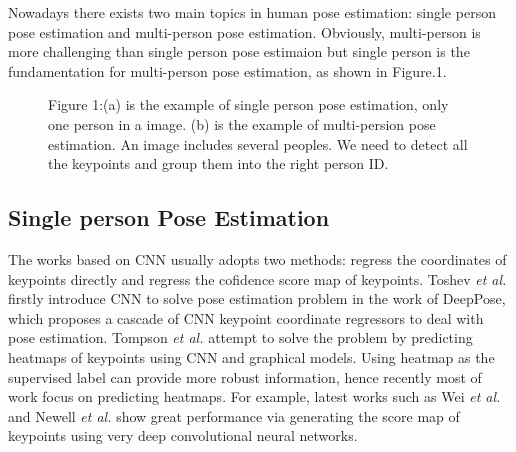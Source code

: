 Nowadays there exists two main topics in human pose estimation: single person pose estimation and multi-person pose estimation. Obviously, multi-person is more challenging than single person pose estimaion but single person is the fundamentation for multi-person pose estimation, as shown in Figure.1.

\captionsetup[figure]{labelformat=empty}
\begin{figure}
  \centering
  \hspace{1in}
  \caption{Figure 1:(a) is the example of single person pose estimation, only one person in a image. (b) is the example of multi-persion pose
  estimation. An image includes several peoples. We need to detect all the keypoints and group them into the right person ID.}
  \label{fig:1} %
\end{figure}

\subsection{Single person Pose Estimation}
The works based on CNN usually adopts two methods: regress the coordinates of keypoints directly and regress the cofidence score map of keypoints. Toshev \textit{et al.} firstly introduce
CNN to solve pose estimation problem in the work of DeepPose\cite{toshev2014deeppose}, which proposes a cascade of CNN keypoint coordinate regressors to deal with pose estimation. Tompson \textit{et al.}\cite{tompson2014joint}
attempt to solve the problem by predicting heatmaps of keypoints using CNN and graphical models.
Using heatmap as the supervised label can provide more robust information, hence recently most of work focus on predicting heatmaps.
For example, latest works such as Wei \textit{et al.}\cite{wei2016convolutional} and Newell \textit{et al.}\cite{newell2016stacked} show great performance via generating the score map of keypoints using very
deep convolutional neural networks.


